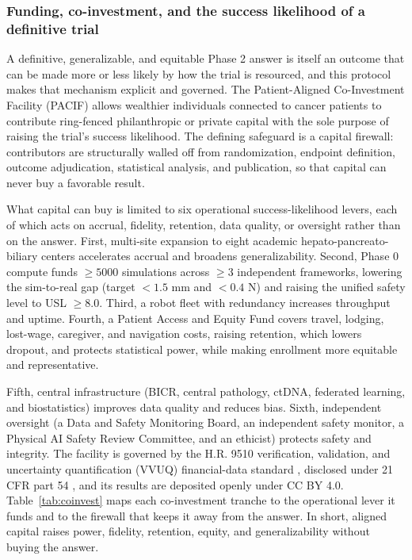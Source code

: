 \subsubsection*{Funding, co-investment, and the success likelihood of a definitive
trial}

A definitive, generalizable, and equitable Phase 2 answer is itself an outcome
that can be made more or less likely by how the trial is resourced, and this
protocol makes that mechanism explicit and governed. The Patient-Aligned
Co-Investment Facility (PACIF) allows wealthier individuals connected to cancer
patients to contribute ring-fenced philanthropic or private capital with the sole
purpose of raising the trial's success likelihood. The defining safeguard is a
capital firewall: contributors are structurally walled off from randomization,
endpoint definition, outcome adjudication, statistical analysis, and publication,
so that capital can never buy a favorable result.

What capital can buy is limited
to six operational success-likelihood levers, each of which acts on accrual,
fidelity, retention, data quality, or oversight rather than on the answer. First,
multi-site expansion to eight academic hepato-pancreato-biliary centers
accelerates accrual and broadens generalizability. Second, Phase 0 compute funds
$\geq 5000$ simulations across $\geq 3$ independent frameworks, lowering the
sim-to-real gap (target $< 1.5$ mm and $< 0.4$ N) and raising the unified safety
level to USL $\geq 8.0$. Third, a robot fleet with redundancy increases throughput
and uptime. Fourth, a Patient Access and Equity Fund covers travel, lodging,
lost-wage, caregiver, and navigation costs, raising retention, which lowers
dropout, and protects statistical power, while making enrollment more
equitable and representative. 

Fifth, central infrastructure (BICR, central
pathology, ctDNA, federated learning, and biostatistics) improves data quality and
reduces bias. Sixth, independent oversight (a Data and Safety Monitoring Board, an
independent safety monitor, a Physical AI Safety Review Committee, and an
ethicist) protects safety and integrity. The facility is governed by the H.R. 9510
verification, validation, and uncertainty quantification (VVUQ) financial-data
standard \cite{kawchak2026hr9510}, disclosed under 21 CFR part 54
\cite{ecfr2026part54}, and its results are deposited openly under CC BY 4.0.
Table~\ref{tab:coinvest} maps each co-investment tranche to the operational lever
it funds and to the firewall that keeps it away from the answer. In short, aligned
capital raises power, fidelity, retention, equity, and generalizability without
buying the answer.

